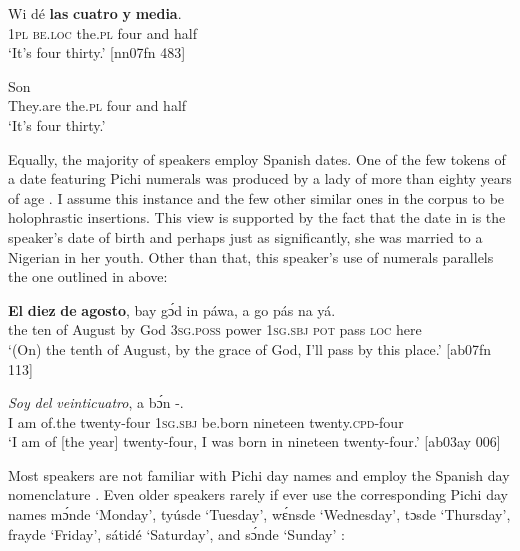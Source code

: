 \ea%
    \label{ex:key:1742}
    \gll Wi  dé    \textbf{las}    \textbf{cuatro}  \textbf{y}  \textbf{media}.\\
\textsc{1pl}  \textsc{be.loc}  the.\textsc{pl}  four    and  half\\

\glt ‘It’s four thirty.’ [nn07fn 483]
\z


\ea%
    \label{ex:key:1743}
    \gll Son              \\
They.are   the.\textsc{pl}   four    and  half\\

\glt ‘It’s four thirty.’
\z

Equally, the majority of speakers employ Spanish dates. One of the few tokens of a date featuring Pichi numerals was produced by a lady of more than eighty years of age . I assume this instance and the few other similar ones in the corpus to be holophrastic insertions. This view is supported by the fact that the date in  is the speaker’s date of birth and perhaps just as significantly, she was married to a Nigerian in her youth. Other than that, this speaker’s use of numerals parallels the one outlined in  above:


\ea%
    \label{ex:key:1744}
    \gll \textbf{El}  \textbf{diez}  \textbf{de}  \textbf{agosto},  bay  gɔ́d  in    páwa,  a    go  pás  na  yá.\\
the  ten  of  August  by  God  \textsc{3sg.poss}  power  \textsc{1sg.sbj}  \textsc{pot}  pass  \textsc{loc}  here\\

\glt ‘(On) the tenth of August, by the grace of God, I’ll pass by this place.’ [ab07fn 113]
\z


\ea%
    \label{ex:key:1745}
    \gll \textit{Soy}    \textit{del}    \textit{veinticuatro},  a    bɔ́n      -.\\
{I am}    of.the  twenty-four  \textsc{1sg.sbj}  be.born  nineteen  twenty.\textsc{cpd}{}-four\\

\glt ‘I am of [the year] twenty-four, I was born in nineteen twenty-four.’ [ab03ay 006]
\z

Most speakers are not familiar with Pichi day names and employ the Spanish day nomenclature . Even older speakers rarely if ever use the corresponding Pichi day names mɔ́nde ‘Monday’, tyúsde ‘Tuesday’, wɛ́nsde ‘Wednesday’, tɔsde ‘Thursday’, frayde ‘Friday’, sátidé ‘Saturday’, and sɔ́nde ‘Sunday’ :


